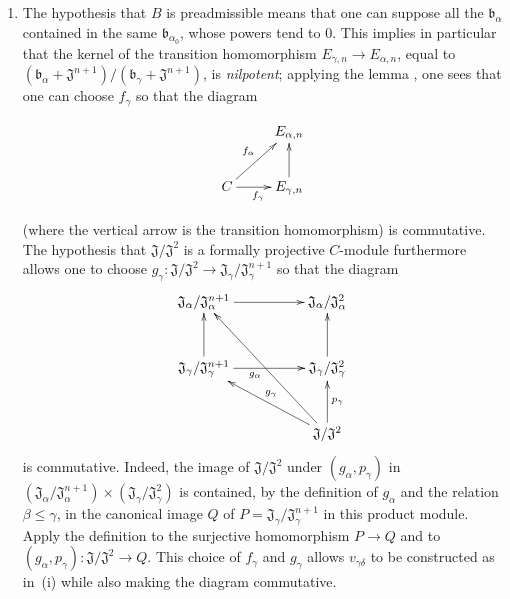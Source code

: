 \begin{env}[19.5.6.4]
\begin{enumerate}
  \item[\rm(ii)] The hypothesis that $B$ is preadmissible means that one can suppose all the $\mathfrak{b}_\alpha$ contained in the same $\mathfrak{b}_{\alpha_0}$, whose powers tend to $0$.
  This implies in particular that the kernel of the transition homomorphism $E_{\gamma,n}\to E_{\alpha,n}$, equal to $(\mathfrak{b}_\alpha+\mathfrak{J}^{n+1})/(\mathfrak{b}_\gamma+\mathfrak{J}^{n+1})$, is \emph{nilpotent};
  applying the lemma , one sees that one can choose $f_\gamma$ so that the diagram
  
\[
\xymatrix{
      & E_{\alpha,n} \\
      C \ar[ur]^{f_\alpha} \ar[r]_{f_\gamma} & E_{\gamma,n} \ar[u]
    }
\]

  (where the vertical arrow is the transition homomorphism) is commutative.
  The hypothesis that $\mathfrak{J}/\mathfrak{J}^2$ is a formally projective $C$-module furthermore allows one to choose $g_\gamma:\mathfrak{J}/\mathfrak{J}^2\to\mathfrak{J}_\gamma/\mathfrak{J}_\gamma^{n+1}$ so that the diagram
  \[
    \xymatrix@C=5em@R=3em{
      \mathfrak{J}_\alpha/\mathfrak{J}_\alpha^{n+1} \ar[r] &
      \mathfrak{J}_\alpha/\mathfrak{J}_\alpha^2 \\
      \mathfrak{J}_\gamma/\mathfrak{J}_\gamma^{n+1} \ar[u] \ar[r] &
      \mathfrak{J}_\gamma/\mathfrak{J}_\gamma^2 \ar[u] \\
      & \mathfrak{J}/\mathfrak{J}^2
        \ar[ul]_{g_\gamma} \ar[u]_{p_\gamma} \ar[uul]^{g_\alpha}
    }
  \]
  is commutative.
  Indeed, the image of $\mathfrak{J}/\mathfrak{J}^2$ under $(g_\alpha,p_\gamma)$ in
  $(\mathfrak{J}_\alpha/\mathfrak{J}_\alpha^{n+1})
  \times(\mathfrak{J}_\gamma/\mathfrak{J}_\gamma^2)$ is contained, by the definition of $g_\alpha$ and the relation $\beta\leq\gamma$, in the canonical image $Q$ of
  $P=\mathfrak{J}_\gamma/\mathfrak{J}_\gamma^{n+1}$ in this product module.
  Apply the definition  to the surjective homomorphism $P\to Q$ and to $(g_\alpha,p_\gamma):\mathfrak{J}/\mathfrak{J}^2\to Q$.
  This choice of $f_\gamma$ and $g_\gamma$ allows $v_{\gamma\delta}$ to be constructed as in~{\rm(i)} while also making the diagram  commutative.
\end{enumerate}
\end{env}


